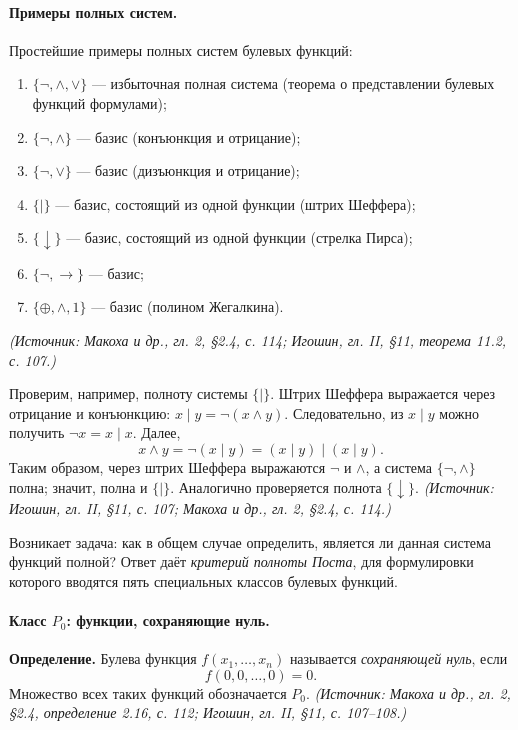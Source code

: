 \documentclass[a4paper,12pt]{article}
\begin{document}
\paragraph{Примеры полных систем.}
Простейшие примеры полных систем булевых функций:
\begin{enumerate}[label=\arabic*)]
\item \(\{\neg,\land,\lor\}\) — избыточная полная система (теорема о представлении булевых функций формулами);
\item \(\{\neg,\land\}\) — базис (конъюнкция и отрицание);
\item \(\{\neg,\lor\}\) — базис (дизъюнкция и отрицание);
\item \(\{\mid\}\) — базис, состоящий из одной функции (штрих Шеффера);
\item \(\{\downarrow\}\) — базис, состоящий из одной функции (стрелка Пирса);
\item \(\{\neg,\to\}\) — базис;
\item \(\{\oplus,\land,1\}\) — базис (полином Жегалкина).
\end{enumerate}
\textit{(Источник: Макоха и др., гл. 2, §2.4, с. 114; Игошин, гл. II, §11, теорема 11.2, с. 107.)}

Проверим, например, полноту системы \(\{\mid\}\). Штрих Шеффера выражается через отрицание и конъюнкцию: \(x\mid y=\neg(x\land y)\). Следовательно, из \(x\mid y\) можно получить \(\neg x=x\mid x\). Далее,
\[
x\land y=\neg(x\mid y)=(x\mid y)\mid(x\mid y).
\]
Таким образом, через штрих Шеффера выражаются \(\neg\) и \(\land\), а система \(\{\neg,\land\}\) полна; значит, полна и \(\{\mid\}\). Аналогично проверяется полнота \(\{\downarrow\}\).
\textit{(Источник: Игошин, гл. II, §11, с. 107; Макоха и др., гл. 2, §2.4, с. 114.)}

Возникает задача: как в общем случае определить, является ли данная система функций полной? Ответ даёт \emph{критерий полноты Поста}, для формулировки которого вводятся пять специальных классов булевых функций.

\paragraph{Класс \(P_0\): функции, сохраняющие нуль.}
\textbf{Определение.} Булева функция \(f(x_1,\ldots,x_n)\) называется \emph{сохраняющей нуль}, если
\[
f(0,0,\ldots,0)=0.
\]
Множество всех таких функций обозначается \(P_0\).
\textit{(Источник: Макоха и др., гл. 2, §2.4, определение 2.16, с. 112; Игошин, гл. II, §11, с. 107--108.)}
\end{document}
